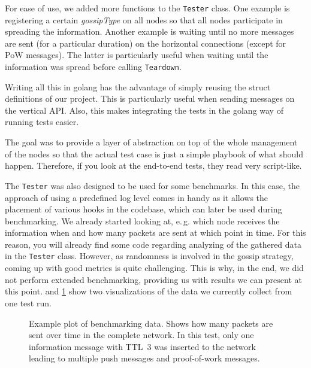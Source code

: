 \documentclass[a4paper,english,10pt,NET]{tumarticle}
\renewcommand{\eg}{\mbox{e.\,g.}\xspace} %
\begin{document}
For ease of use, we added more functions to the \texttt{Tester} class.
One example is registering a certain \emph{gossipType} on all nodes so that all nodes participate in spreading the information.
Another example is waiting until no more messages are sent (for a particular duration) on the horizontal connections (except for PoW messages).
The latter is particularly useful when waiting until the information was spread before calling \texttt{Teardown}.

Writing all this in golang has the advantage of simply reusing the struct definitions of our project.
This is particularly useful when sending messages on the vertical API.
Also, this makes integrating the tests in the golang way of running tests easier.

The goal was to provide a layer of abstraction on top of the whole management of the nodes so that the actual test case is just a simple playbook of what should happen.
Therefore, if you look at the end-to-end tests, they read very script-like.

The \texttt{Tester} was also designed to be used for some benchmarks.
In this case, the approach of using a predefined log level comes in handy as it allows the placement of various hooks in the codebase, which can later be used during benchmarking.
We already started looking at, \eg which node receives the information when and how many packets are sent at which point in time.
For this reason, you will already find some code regarding analyzing of the gathered data in the \texttt{Tester} class.
However, as randomness is involved in the gossip strategy, coming up with good metrics is quite challenging.
This is why, in the end, we did not perform extended benchmarking, providing us with results we can present at this point.
 and \cref{fig:packetsOverTime} show two visualizations of the data we currently collect from one test run.

\begin{figure}
	\centering
	
	\caption{
		Example plot of benchmarking data.
		Shows how many packets are sent over time in the complete network.
		In this test, only one information message with TTL~3 was inserted to the network leading to multiple push messages and proof-of-work messages.
	}
	\label{fig:packetsOverTime}
\end{figure}
\end{document}
